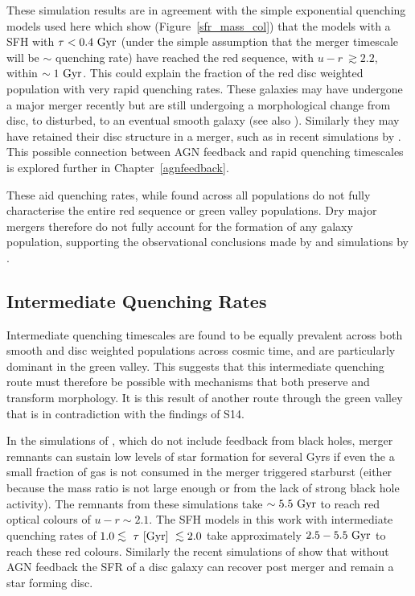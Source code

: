 These simulation results are in agreement with the simple exponential quenching models used here which show (Figure~\ref{sfr_mass_col}) that the models with a SFH with $\tau < 0.4~\rm{Gyr}$ (under the simple assumption that the merger timescale will be $\sim$ quenching rate) have reached the red sequence, with $u-r ~\gtrsim 2.2$, within $\sim1~\rm{Gyr}$. This could explain the fraction of the red disc weighted population with very rapid quenching rates. These galaxies may have undergone a major merger recently but are still undergoing a morphological change from disc, to disturbed, to an eventual smooth galaxy (see also \citealt{vdW09}). Similarly they may have retained their disc structure in a merger, such as in recent simulations by \citet{pontzen16}. This possible connection between AGN feedback and rapid quenching timescales is explored further in Chapter~\ref{agnfeedback}. 

These aid quenching rates, while found across all populations do not fully characterise the entire red sequence or green valley populations. Dry major mergers therefore do not fully account for the formation of any galaxy population, supporting the observational conclusions made by \citet{Bell07,Bundy07, kaviraj14a} and simulations by \citet{Genel08}. 

\subsection{Intermediate Quenching Rates}\label{int}

Intermediate quenching timescales are found to be equally prevalent across both smooth and disc weighted populations across cosmic time, and are particularly dominant in the green valley. This suggests that this intermediate quenching route must therefore be possible with mechanisms that both preserve and transform morphology. It is this result of another route through the green valley that is in contradiction with the findings of S14. 

In the simulations of \citet*{springel05b}, which do not include feedback from black holes, merger remnants can sustain low levels of star formation for several Gyrs if even the a small fraction of gas is not consumed in the merger triggered starburst (either because the mass ratio is not large enough or from the lack of strong black hole activity). The remnants from these simulations take $\sim5.5~\rm{Gyr}$ to reach red optical colours of $u-r \sim 2.1$. The SFH models in this work with intermediate quenching rates of $1.0 \lesssim ~\tau~\rm{[Gyr]} ~\lesssim 2.0$ take approximately $2.5-5.5~\rm{Gyr}$ to reach these red colours. Similarly the recent simulations of \citet{pontzen16} show that without AGN feedback the SFR of a disc galaxy can recover post merger and remain a star forming disc. 

